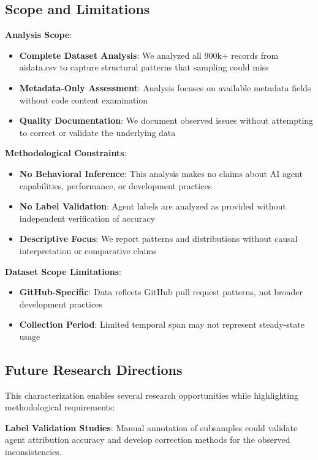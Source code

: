\documentclass[conference]{IEEEtran}
\begin{document}
\subsection{Scope and Limitations}

\textbf{Analysis Scope}:
\begin{itemize}
    \item \textbf{Complete Dataset Analysis}: We analyzed all 900k+ records from aidata.csv to capture structural patterns that sampling could miss
    \item \textbf{Metadata-Only Assessment}: Analysis focuses on available metadata fields without code content examination
    \item \textbf{Quality Documentation}: We document observed issues without attempting to correct or validate the underlying data
\end{itemize}

\textbf{Methodological Constraints}:
\begin{itemize}
    \item \textbf{No Behavioral Inference}: This analysis makes no claims about AI agent capabilities, performance, or development practices
    \item \textbf{No Label Validation}: Agent labels are analyzed as provided without independent verification of accuracy
    \item \textbf{Descriptive Focus}: We report patterns and distributions without causal interpretation or comparative claims
\end{itemize}

\textbf{Dataset Scope Limitations}:
\begin{itemize}
    \item \textbf{GitHub-Specific}: Data reflects GitHub pull request patterns, not broader development practices
    \item \textbf{Collection Period}: Limited temporal span may not represent steady-state usage

\end{itemize}

\subsection{Future Research Directions}

This characterization enables several research opportunities while highlighting methodological requirements:

\textbf{Label Validation Studies}: Manual annotation of subsamples could validate agent attribution accuracy and develop correction methods for the observed inconsistencies.
\end{document}
